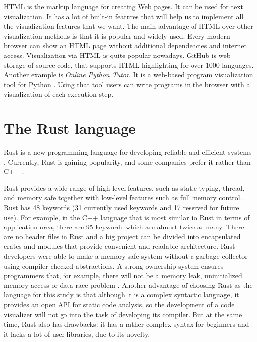 HTML is the markup language for creating Web pages. It can be used for text visualization. It has a lot of built-in features that will help us to implement all the visualization features that we want. The main advantage of HTML over other visualization methods is that it is popular and widely used. Every modern browser can show an HTML page without additional dependencies and internet access.
Visualization via HTML is quite popular nowadays. 
GitHub \cite{github} is web storage of source code, that supports HTML highlighting for over 1000 languages.
Another example is \textit{Online Python Tutor}. It is a web-based program visualization tool for Python \cite{python}. Using that tool users can write programs in the browser with a visualization of each execution step.





\section{The Rust language}
\label{sec:rust}
Rust is a new programming language for developing reliable and efficient systems \cite{rust-official}.
Currently, Rust is gaining popularity, and some companies prefer it rather than C++ \cite{top-lang}. 

Rust provides a wide range of high-level features, such as static typing, thread, and memory safe together with low-level features such as full memory control.
Rust has 48 keywords (31 currently used keywords and 17 reserved for future use). For example, in the C++ language that is most similar to Rust in terms of application area, there are 95 keywords which are almost twice as many. 
There are no header files in Rust and a big project can be divided into encapsulated crates and modules that provide convenient and readable architecture. 
Rust developers were able to make a memory-safe system without a garbage collector using compiler-checked abstractions. A strong ownership system ensures programmers that, for example, there will not be a memory leak, uninitialized memory access or data-race problem \cite{reed2015patina}.
Another advantage of choosing Rust as the language for this study is that although it is a complex syntactic language, it provides an open API for static code analysis, so the development of a code visualizer will not go into the task of developing its compiler.
But at the same time, Rust also has drawbacks: it has a rather complex syntax for beginners and it lacks a lot of user libraries, due to its novelty.

